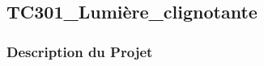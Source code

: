 \documentclass[a4paper,12pt]{report}
\begin{document}
\subsection{TC301\_Lumière\_clignotante}
\begin{center}
\label{}
\end{center}
\subsubsection{Description du Projet}
\end{document}

